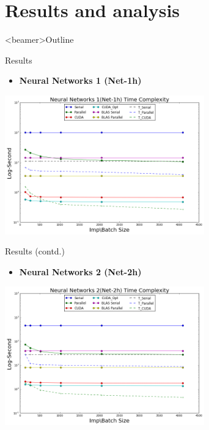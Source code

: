 \section{Results and analysis}
\begin{frame}<beamer>{Outline}
  \end{frame}
 \begin{frame}{Results}
     \begin{itemize}
         \item{ \textbf{Neural Networks 1 (Net-1h)}
         }
     \end{itemize}
     
		\begin{center}
		\includegraphics[width=3.4in]{nn1_time.png}
		\end{center}

 \end{frame}
 
\begin{frame}{Results (contd.)}
     \begin{itemize}
         \item{ \textbf{Neural Networks 2 (Net-2h)}
         }
     \end{itemize}
     
		\begin{center}
		\includegraphics[width=3.4in]{nn2_time.png}
		\end{center}

 \end{frame} 

